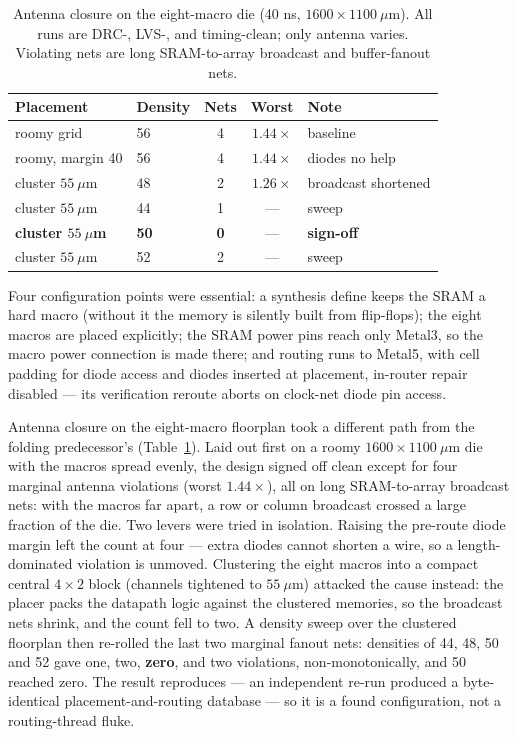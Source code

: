 \documentclass[conference,a4paper]{APSIPA2026}
\begin{document}
\begin{table}[!ht]
\caption{Antenna closure on the eight-macro die (40 ns, $1600\times1100~\mu$m). All runs are DRC-, LVS-, and timing-clean; only antenna varies. Violating nets are long SRAM-to-array broadcast and buffer-fanout nets.}
\label{tab:antenna}
\centering
\renewcommand{\arraystretch}{1.0}
\begin{tabular}{@{}llccl@{}}
\toprule
Placement & Density & Nets & Worst & Note \\
\midrule
roomy grid          & 56 & 4 & $1.44\times$ & baseline \\
roomy, margin 40    & 56 & 4 & $1.44\times$ & diodes no help \\
\midrule
cluster $55~\mu$m   & 48 & 2 & $1.26\times$ & broadcast shortened \\
cluster $55~\mu$m   & 44 & 1 & ---          & sweep \\
\textbf{cluster $55~\mu$m} & \textbf{50} & \textbf{0} & --- & \textbf{sign-off} \\
cluster $55~\mu$m   & 52 & 2 & ---          & sweep \\
\bottomrule
\end{tabular}
\end{table}
Four configuration points were essential: a synthesis define keeps the SRAM a hard macro (without it the memory is silently built from flip-flops); the eight macros are placed explicitly; the SRAM power pins reach only Metal3, so the macro power connection is made there; and routing runs to Metal5, with cell padding for diode access and diodes inserted at placement, in-router repair disabled --- its verification reroute aborts on clock-net diode pin access.

Antenna closure on the eight-macro floorplan took a different path from the folding predecessor's (Table~\ref{tab:antenna}). Laid out first on a roomy $1600\times1100~\mu$m die with the macros spread evenly, the design signed off clean except for four marginal antenna violations (worst $1.44\times$), all on long SRAM-to-array broadcast nets: with the macros far apart, a row or column broadcast crossed a large fraction of the die. Two levers were tried in isolation. Raising the pre-route diode margin left the count at four --- extra diodes cannot shorten a wire, so a length-dominated violation is unmoved. Clustering the eight macros into a compact central $4\times2$ block (channels tightened to $55~\mu$m) attacked the cause instead: the placer packs the datapath logic against the clustered memories, so the broadcast nets shrink, and the count fell to two. A density sweep over the clustered floorplan then re-rolled the last two marginal fanout nets: densities of 44, 48, 50 and 52 gave one, two, \textbf{zero}, and two violations, non-monotonically, and 50 reached zero. The result reproduces --- an independent re-run produced a byte-identical placement-and-routing database --- so it is a found configuration, not a routing-thread fluke.
\end{document}
